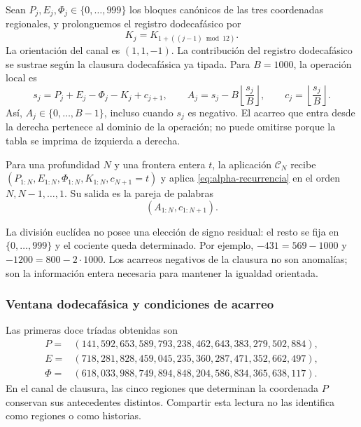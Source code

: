 Sean \(P_j,E_j,\Phi_j\in\{0,\ldots,999\}\) los bloques canónicos de
las tres coordenadas regionales, y prolonguemos el registro dodecafásico por
\[
 K_j=K_{1+((j-1)\bmod12)}.
\]
La orientación del canal es \((1,1,-1)\). La contribución del registro dodecafásico se
sustrae según la clausura dodecafásica ya tipada. Para \(B=1000\), la
operación local es
\begin{equation}
 s_j=P_j+E_j-\Phi_j-K_j+c_{j+1},\qquad
 A_j=s_j-B\left\lfloor\frac{s_j}{B}\right\rfloor,
 \qquad c_j=\left\lfloor\frac{s_j}{B}\right\rfloor.
 \label{eq:alpha-recurrencia}
\end{equation}
Así, \(A_j\in\{0,\ldots,B-1\}\), incluso cuando \(s_j\) es
negativo. El acarreo que entra desde la derecha pertenece al dominio de
la operación; no puede omitirse porque la tabla se imprima de izquierda
a derecha.

\begin{definition}
\label{def:alpha-finita}
Para una profundidad \(N\) y una frontera entera \(t\), la aplicación
\(\mathcal C_N\) recibe
\((P_{1:N},E_{1:N},\Phi_{1:N},K_{1:N},c_{N+1}=t)\) y aplica
\eqref{eq:alpha-recurrencia} en el orden \(N,N-1,\ldots,1\). Su salida
es la pareja de palabras
\[
 (A_{1:N},c_{1:N+1}).
\]
\end{definition}

La división euclídea no posee una elección de signo residual: el resto se
fija en \(\{0,\ldots,999\}\) y el cociente queda determinado. Por
ejemplo, \(-431=569-1000\) y \(-1200=800-2\cdot1000\). Los
acarreos negativos de la clausura no son anomalías; son la información
entera necesaria para mantener la igualdad orientada.

\subsubsection{Ventana dodecafásica y condiciones de acarreo}
\label{subsec:alpha-ventana}

Las primeras doce tríadas obtenidas son
\begin{align*}
 P={}&(141,592,653,589,793,238,462,643,383,279,502,884),\\
 E={}&(718,281,828,459,045,235,360,287,471,352,662,497),\\
 \Phi={}&(618,033,988,749,894,848,204,586,834,365,638,117).
\end{align*}
En el canal de clausura, las cinco regiones que determinan la coordenada
\(P\) conservan sus antecedentes distintos. Compartir esta lectura no
las identifica como regiones o como historias.

